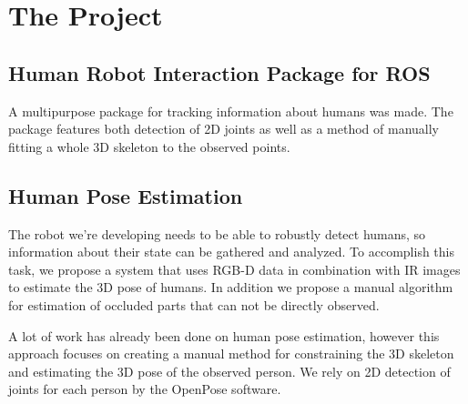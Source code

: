 \chapter{The Project}

\section{Human Robot Interaction Package for ROS}




A multipurpose package for tracking information about humans was made. The package features both detection of 2D joints as well as a method of manually fitting a whole 3D skeleton to the observed points.

\section{Human Pose Estimation}

The robot we're developing needs to be able to robustly detect humans, so information about their state can be gathered and analyzed. To accomplish this task, we propose a system that uses RGB-D data in combination with IR images to estimate the 3D pose of humans. In addition we propose a manual algorithm for estimation of occluded parts that can not be directly observed. 

A lot of work has already been done on human pose estimation, however this approach focuses on creating a manual method for constraining the 3D skeleton and estimating the 3D pose of the observed person. We rely on 2D detection of joints for each person by the OpenPose software. 

